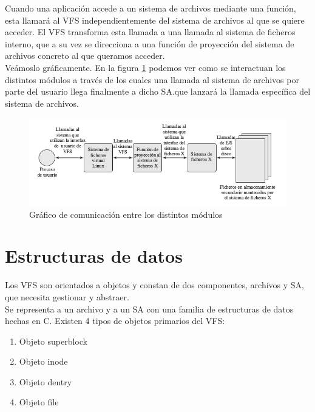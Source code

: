 \documentclass[11pt,a4paper]{article}
\newcommand\tab[1][1cm]{\hspace*{#1}}
\begin{document}
\tab Cuando una aplicación accede a un sistema de archivos mediante una función, esta llamará al VFS independientemente del sistema de archivos al que se quiere acceder. El VFS transforma esta llamada a una llamada al sistema de ficheros interno, que a su vez se direcciona a una función de proyección del sistema de archivos concreto al que queramos acceder.\\

\tab Veámoslo gráficamente. En la figura \ref{figura 2} podemos ver como se interactuan los distintos módulos a través de los cuales una llamada al sistema de archivos por parte del usuario llega finalmente a dicho SA.que lanzará la llamada específica del sistema de archivos. \\

\begin{figure}[H]
  \centering
	\includegraphics[scale=0.65]{capturas/funciones}
  \caption{Gráfico de comunicación entre los distintos módulos \cite{stalling}} \label{figura 2}
\end{figure} 

\section {Estructuras de datos \cite{kernel-doc}}

\tab Los VFS son orientados a objetos y constan de dos componentes, archivos y SA, que necesita gestionar y abstraer. \\

\tab Se representa a un archivo y a un SA con una familia de estructuras  de  datos hechas en C. Existen 4 tipos de objetos primarios del VFS:

\begin{enumerate}
	\item Objeto superblock
	\item Objeto inode
	\item Objeto dentry
	\item Objeto file
\end{enumerate}
\end{document}
